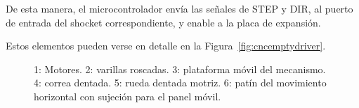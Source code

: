 De esta manera, el microcontrolador envía las señales de STEP y DIR, al puerto de entrada del shocket correspondiente, y enable a la placa de expansión.

Estos elementos pueden verse en detalle en la Figura~\ref{fig:cncemptydriver}.

\begin{figure}[t]
	\centering
\end{figure}

\begin{figure}[t]
	\centering
	\ContinuedFloat	
	\caption{1: Motores. 2: varillas roscadas. 3: plataforma móvil del mecanismo. 4: correa dentada. 5: rueda dentada motriz. 6: patín del movimiento horizontal con sujeción para el panel móvil.}
\end{figure}



